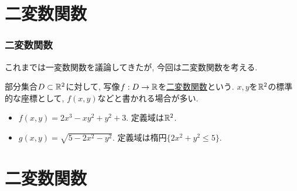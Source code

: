 




\section{二変数関数}


\begin{frame}
\frametitle{二変数関数}


これまでは一変数関数を議論してきたが, 今回は二変数関数を考える. 


\begin{Def}
部分集合$D \subset \mathbb{R}^2$に対して, 写像$f:D\rightarrow \mathbb{R}$を\underline{二変数関数}という. 
$x,y$を$\mathbb{R}^2$の標準的な座標として, $f(x,y)$などと書かれる場合が多い. 
\end{Def}

\begin{itemize}
\item $f(x,y)=2x^3-xy^2+y^2+3$. 定義域は$\mathbb{R}^2$. 
\item $g(x,y)=\sqrt{5-2x^2-y^2}$. 定義域は楕円$\{2x^2+y^2 \le 5\}$. 

\end{itemize}


\end{frame}






\section{二変数関数}



